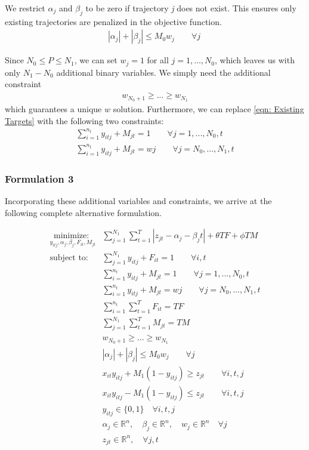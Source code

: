 \documentclass[journal]{IEEEtran}
\begin{document}
We restrict $\alpha_{j}$ and $\beta_{j}$ to be zero if trajectory \textit{j} does not exist. This ensures only existing trajectories are penalized in the objective function. 
\begin{align}
|\alpha_{j}|+|\beta_{j}| \leq M_{0}w_{j}\qquad \forall j\
\end{align}

Since $N_{0} \leq P \leq N_{1}$, we can set $w_j=1$ for all $j=1,\ldots,N_0$, which leaves us with only $N_1-N_0$ additional binary variables. We simply need the additional constraint
\begin{align}
w_{N_0+1}\geq ...\geq w_{N_1}
\end{align}
which guarantees a unique $w$ solution.
Furthermore, we can replace \eqref{eqn: Existing Targets} with the following two constraints:
\begin{align}
	\sum_{i=1}^{n_{t}} y_{itj} + M_{jt} = 1 \qquad \forall j=1,...,N_{0},t\\
	\sum_{i=1}^{n_{t}} y_{itj} + M_{jt} = w{j} \qquad \forall j=N_{0},...,N_{1},t
\end{align}

\subsubsection{Formulation 3}
Incorporating these additional variables and constraints, we arrive at the following complete alternative formulation.

\begin{align*}
\underset{y_{itj}, \alpha_{j}, \beta_{j},F_{it},M_{jt}}{\text{minimize: }} & \sum_{j=1}^{N_{1}} \sum_{t=1}^{T} |z_{jt} - \alpha_{j} - \beta_{j}t| + \theta TF + \phi TM\\
\text{subject to: }	& \sum_{j=1}^{N_{1}} y_{itj} + F_{it} = 1 \qquad \forall i,t\\
				& \sum_{i=1}^{n_{t}} y_{itj} + M_{jt} = 1 \qquad \forall j=1,...,N_{0},t\\
				& \sum_{i=1}^{n_{t}} y_{itj} + M_{jt} = w{j} \qquad \forall j=N_{0},...,N_{1},t\\
				& \sum_{i=1}^{n_{t}} \sum_{t=1}^{T} F_{it} = TF\\
				& \sum_{j=1}^{N_{1}} \sum_{t=1}^{T} M_{jt} = TM\\
				& w_{N_0+1}\geq ...\geq w_{N_1}\\
				& |\alpha_{j}|+|\beta_{j}| \leq M_{0}w_{j}\qquad \forall j\\
				& x_{it}y_{itj} + M_{1}(1-y_{itj}) \geq z_{jt} \qquad \forall i,t,j\\
				& x_{it}y_{itj} - M_{1}(1-y_{itj}) \leq z_{jt} \qquad \forall i,t,j\\
			 	& y_{itj} \in \{0,1\} \quad \forall i,t,j\\
				& \alpha_{j} \in \mathbb{R}^n,\quad \beta_{j} \in \mathbb{R}^n,\quad w_{j} \in \mathbb{R}^n \quad \forall j\\
				& z_{jt} \in \mathbb{R}^n, \quad \forall j,t
\end{align*}
\end{document}

